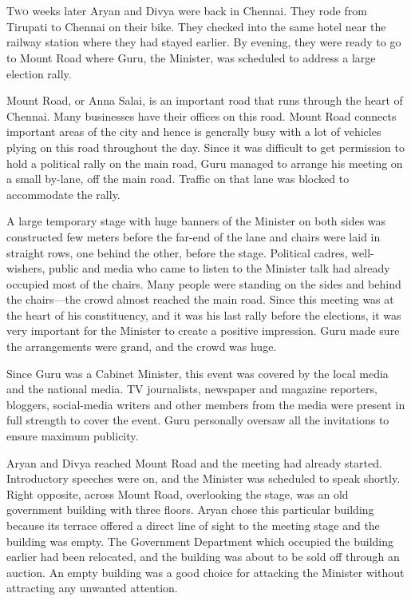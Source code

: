\chapter{}

\lettrine{T}{wo} weeks later Aryan and Divya were back in Chennai. They rode from Tirupati to
Chennai on their bike. They checked into the same hotel near the railway station
where they had stayed earlier. By evening, they were ready to go to Mount Road
where Guru, the Minister, was scheduled to address a large election rally.

Mount Road, or Anna Salai, is an important road that runs through the heart of
Chennai. Many businesses have their offices on this road. Mount Road connects
important areas of the city and hence is generally busy with a lot of vehicles
plying on this road throughout the day. Since it was difficult to get permission
to hold a political rally on the main road, Guru managed to arrange his meeting
on a small by-lane, off the main road. Traffic on that lane was blocked to
accommodate the rally.

A large temporary stage with huge banners of the Minister on both sides was
constructed few meters before the far-end of the lane and chairs were laid in
straight rows, one behind the other, before the stage. Political cadres,
well-wishers, public and media who came to listen to the Minister talk had
already
occupied most of the chairs. Many people were standing on the sides and behind
the chairs—the crowd almost reached the main road. Since this meeting was at
the heart of his constituency, and it was his last rally before the elections,
it was very important for the Minister to create a positive impression. Guru
made sure the arrangements were grand, and the crowd was huge.

Since Guru was a Cabinet Minister, this event was covered by the local media and
the national media. TV journalists, newspaper and magazine reporters, bloggers,
social-media writers and other members from the media were present in full
strength to cover the event. Guru personally oversaw all the invitations to
ensure maximum publicity.

Aryan and Divya reached Mount Road and the meeting had already started.
Introductory speeches were on, and the Minister was scheduled to speak shortly.
Right opposite, across Mount Road, overlooking the stage, was an old government
building with three floors. Aryan chose this particular building because its
terrace offered a direct line of sight to the meeting stage and the building was
empty. The Government Department which occupied the building earlier had been
relocated, and the building was about to be sold off through an auction. An empty
building was a good choice for attacking the Minister without attracting any
unwanted attention.

